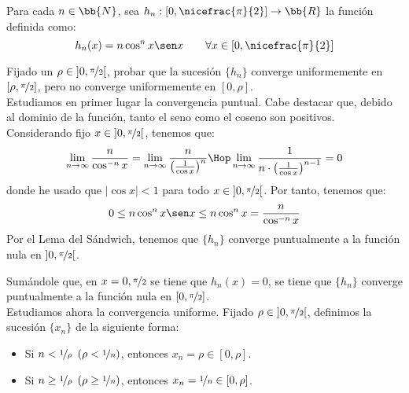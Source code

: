 \begin{ejercicio}
    Para cada $n\in \bb{N}$, sea $h_n:\left[0,\nicefrac{\pi}{2}\right]\to \bb{R}$ la función definida como:
    \begin{equation*}
        h_n(x) = n\cos^n x \sen x \qquad \forall x\in \left[0,\nicefrac{\pi}{2}\right]
    \end{equation*}

    Fijado un $\rho\in \left]0,\nicefrac{\pi}{2}\right[$, probar que la sucesión $\{h_n\}$ converge uniformemente en $[\rho,\nicefrac{\pi}{2}]$, pero no converge uniformemente en $\left[0,\rho\right]$.\\


    Estudiamos en primer lugar la convergencia puntual. Cabe destacar que, debido al 
    dominio de la función, tanto el seno como el coseno son positivos.
    Considerando fijo $x\in \left]0,\nicefrac{\pi}{2}\right[$, tenemos que:
    \begin{equation*}
        \lim_{n\to \infty} \frac{n}{\cos^{-n} x}
        = \lim_{n\to \infty} \frac{n}{\left(\frac{1}{\cos x}\right)^n}
        \Hop
        \lim_{n\to \infty} \frac{1}{n\cdot \left(\frac{1}{\cos x}\right)^{n-1}} = 0
    \end{equation*}
    donde he usado que $|\cos x|<1$ para todo $x\in \left]0,\nicefrac{\pi}{2}\right[$. Por tanto, tenemos que:
    \begin{equation*}
        0 \leq n\cos^n x \sen x \leq n\cos^n x = \frac{n}{\cos^{-n} x}
    \end{equation*}
    Por el Lema del Sándwich, tenemos que $\{h_n\}$ converge puntualmente a la función nula en $\left]0,\nicefrac{\pi}{2}\right[$.
    
    Sumándole que, en $x=0,\nicefrac{\pi}{2}$ se tiene que $h_n(x)=0$, se tiene que $\{h_n\}$ converge puntualmente a la función nula en $\left[0,\nicefrac{\pi}{2}\right]$.\\

    Estudiamos ahora la convergencia uniforme. Fijado $\rho\in \left]0,\nicefrac{\pi}{2}\right[$, definimos la sucesión $\{x_n\}$ de la siguiente forma:
    \begin{itemize}
        \item Si $n < \nicefrac{1}{\rho}~\left(\rho < \nicefrac{1}{n}\right)$, entonces $x_n = \rho \in [0, \rho]$.
        \item Si $n \geq \nicefrac{1}{\rho}~\left(\rho \geq \nicefrac{1}{n}\right)$, entonces $x_n = \nicefrac{1}{n}\in [0, \rho]$.
    \end{itemize}


\end{ejercicio}
